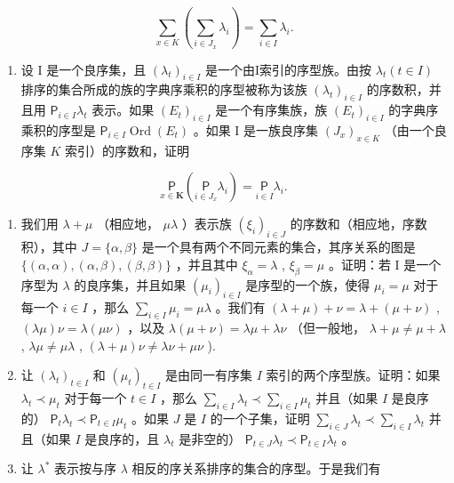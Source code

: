 \[
\sum_ {x \in K} \left(\sum_ {i \in J _ {x}} \lambda_ {i}\right) = \sum_ {i \in I} \lambda_ {i}.
\]

\begin{enumerate}
\def\labelenumi{(\alph{enumi})}
\setcounter{enumi}{3}
\tightlist
\item
  设 I 是一个良序集，且 \((\lambda_{t})_{i\in I}\) 是一个由I索引的序型族。由按 \(\lambda_{t} (t\in I)\) 排序的集合所成的族的字典序乘积的序型被称为该族 \((\lambda_{t})_{i\in I}\) 的序数积，并且用 \(\mathsf{P}_{i\in I}\lambda_{t}\) 表示。如果 \((E_{t})_{i\in I}\) 是一个有序集族，族 \((E_{t})_{i\in I}\) 的字典序乘积的序型是 \(\mathsf{P}_{i\in I}\operatorname{Ord}(E_{t})\) 。如果 I 是一族良序集 \((J_{x})_{x\in K}\) （由一个良序集 \(K\) 索引）的序数和，证明
\end{enumerate}

\[
\underset {x \in \mathbf {K}} {\mathsf {P}} \left(\underset {i \in J _ {x}} {\mathsf {P}} \lambda_ {i}\right) = \underset {i \in I} {\mathsf {P}} \lambda_ {i}.
\]

\begin{enumerate}
\def\labelenumi{(\alph{enumi})}
\setcounter{enumi}{4}
\item
  我们用 \(\lambda + \mu\) （相应地， \(\mu\lambda\) ）表示族 \((\xi_{i})_{i \in J}\) 的序数和（相应地，序数积），其中 \(J = \{\alpha, \beta\}\) 是一个具有两个不同元素的集合，其序关系的图是 \(\{(\alpha, \alpha), (\alpha, \beta), (\beta, \beta)\}\) ，并且其中 \(\xi_{\alpha} = \lambda\) , \(\xi_{\beta} = \mu\) 。证明：若 I 是一个序型为 \(\lambda\) 的良序集，并且如果 \((\mu_{i})_{i \in I}\) 是序型的一个族，使得 \(\mu_{i} = \mu\) 对于每一个 \(i \in I\) ，那么 \(\sum_{i \in I} \mu_{i} = \mu\lambda\) 。我们有 \((\lambda + \mu) + \nu = \lambda + (\mu + \nu)\) , \((\lambda\mu)\nu = \lambda(\mu\nu)\) ，以及 \(\lambda(\mu + \nu) = \lambda\mu + \lambda\nu\) （但一般地， \(\lambda + \mu \neq \mu + \lambda\) , \(\lambda\mu \neq \mu\lambda\) , \((\lambda + \mu)\nu \neq \lambda\nu + \mu\nu\) ).
\item
  让 \((\lambda_{t})_{t\in I}\) 和 \((\mu_{t})_{t\in I}\) 是由同一有序集 \(I\) 索引的两个序型族。证明：如果 \(\lambda_{t} \prec \mu_{t}\) 对于每一个 \(t \in I\) ，那么 \(\sum_{i \in I} \lambda_{t} \prec \sum_{i \in I} \mu_{t}\) 并且（如果 \(I\) 是良序的） \(\mathsf{P}_{t} \lambda_{t} \prec \mathsf{P}_{t \in I} \mu_{t}\) 。如果 \(J\) 是 \(I\) 的一个子集，证明 \(\sum_{i \in J} \lambda_{t} \prec \sum_{i \in I} \lambda_{t}\) 并且（如果 \(I\) 是良序的，且 \(\lambda_{t}\) 是非空的） \(\mathsf{P}_{t \in J} \lambda_{t} \prec \mathsf{P}_{t \in I} \lambda_{t}\) 。
\item
  让 \(\lambda^{*}\) 表示按与序 \(\lambda\) 相反的序关系排序的集合的序型。于是我们有
\end{enumerate}

